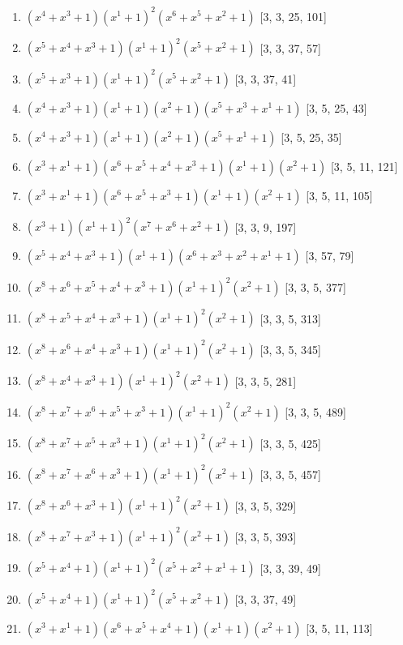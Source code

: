 \documentclass[10pt,twocolumn]{article}
\begin{document}
\begin{enumerate}
\item $(x^{4} + x^{3} + 1)(x^{1} + 1)^{2}(x^{6} + x^{5} + x^{2} + 1)$  [3, 3, 25, 101]
\item $(x^{5} + x^{4} + x^{3} + 1)(x^{1} + 1)^{2}(x^{5} + x^{2} + 1)$  [3, 3, 37, 57]
\item $(x^{5} + x^{3} + 1)(x^{1} + 1)^{2}(x^{5} + x^{2} + 1)$  [3, 3, 37, 41]
\item $(x^{4} + x^{3} + 1)(x^{1} + 1)(x^{2} + 1)(x^{5} + x^{3} + x^{1} + 1)$  [3, 5, 25, 43]
\item $(x^{4} + x^{3} + 1)(x^{1} + 1)(x^{2} + 1)(x^{5} + x^{1} + 1)$  [3, 5, 25, 35]
\item $(x^{3} + x^{1} + 1)(x^{6} + x^{5} + x^{4} + x^{3} + 1)(x^{1} + 1)(x^{2} + 1)$  [3, 5, 11, 121]
\item $(x^{3} + x^{1} + 1)(x^{6} + x^{5} + x^{3} + 1)(x^{1} + 1)(x^{2} + 1)$  [3, 5, 11, 105]
\item $(x^{3} + 1)(x^{1} + 1)^{2}(x^{7} + x^{6} + x^{2} + 1)$  [3, 3, 9, 197]
\item $(x^{5} + x^{4} + x^{3} + 1)(x^{1} + 1)(x^{6} + x^{3} + x^{2} + x^{1} + 1)$  [3, 57, 79]
\item $(x^{8} + x^{6} + x^{5} + x^{4} + x^{3} + 1)(x^{1} + 1)^{2}(x^{2} + 1)$  [3, 3, 5, 377]
\item $(x^{8} + x^{5} + x^{4} + x^{3} + 1)(x^{1} + 1)^{2}(x^{2} + 1)$  [3, 3, 5, 313]
\item $(x^{8} + x^{6} + x^{4} + x^{3} + 1)(x^{1} + 1)^{2}(x^{2} + 1)$  [3, 3, 5, 345]
\item $(x^{8} + x^{4} + x^{3} + 1)(x^{1} + 1)^{2}(x^{2} + 1)$  [3, 3, 5, 281]
\item $(x^{8} + x^{7} + x^{6} + x^{5} + x^{3} + 1)(x^{1} + 1)^{2}(x^{2} + 1)$  [3, 3, 5, 489]
\item $(x^{8} + x^{7} + x^{5} + x^{3} + 1)(x^{1} + 1)^{2}(x^{2} + 1)$  [3, 3, 5, 425]
\item $(x^{8} + x^{7} + x^{6} + x^{3} + 1)(x^{1} + 1)^{2}(x^{2} + 1)$  [3, 3, 5, 457]
\item $(x^{8} + x^{6} + x^{3} + 1)(x^{1} + 1)^{2}(x^{2} + 1)$  [3, 3, 5, 329]
\item $(x^{8} + x^{7} + x^{3} + 1)(x^{1} + 1)^{2}(x^{2} + 1)$  [3, 3, 5, 393]
\item $(x^{5} + x^{4} + 1)(x^{1} + 1)^{2}(x^{5} + x^{2} + x^{1} + 1)$  [3, 3, 39, 49]
\item $(x^{5} + x^{4} + 1)(x^{1} + 1)^{2}(x^{5} + x^{2} + 1)$  [3, 3, 37, 49]
\item $(x^{3} + x^{1} + 1)(x^{6} + x^{5} + x^{4} + 1)(x^{1} + 1)(x^{2} + 1)$  [3, 5, 11, 113]

\end{enumerate}
\end{document}

